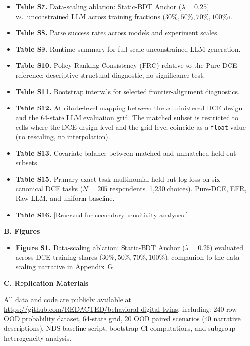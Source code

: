 \documentclass[11pt]{article}
\begin{document}
\begin{itemize}
\item \textbf{Table S7.} Data-scaling ablation: Static-BDT Anchor ($\lambda=0.25$) vs.\ unconstrained LLM across training fractions ($30\%, 50\%, 70\%, 100\%$).
\item \textbf{Table S8.} Parse success rates across models and experiment scales.
\item \textbf{Table S9.} Runtime summary for full-scale unconstrained LLM generation.
\item \textbf{Table S10.} Policy Ranking Consistency (PRC) relative to the Pure-DCE reference; descriptive structural diagnostic, no significance test.
\item \textbf{Table S11.} Bootstrap intervals for selected frontier-alignment diagnostics.
\item \textbf{Table S12.} Attribute-level mapping between the administered DCE design and the 64-state LLM evaluation grid. The matched subset is restricted to cells where the DCE design level and the grid level coincide as a \texttt{float} value (no rescaling, no interpolation).
\item \textbf{Table S13.} Covariate balance between matched and unmatched held-out subsets.
\item \textbf{Table S15.} Primary exact-task multinomial held-out log loss on six canonical DCE tasks ($N = 205$ respondents, 1,230 choices). Pure-DCE, EFR, Raw LLM, and uniform baseline.
\item \textbf{Table S16.} [Reserved for secondary sensitivity analyses.]
\end{itemize}

\textbf{B. Figures}
\begin{itemize}\setlength{\itemsep}{0pt}
\item \textbf{Figure S1.} Data-scaling ablation: Static-BDT Anchor ($\lambda = 0.25$) evaluated across DCE training shares ($30\%, 50\%, 70\%, 100\%$); companion to the data-scaling narrative in Appendix~G.
\end{itemize}

\textbf{C. Replication Materials}

All data and code are publicly available at \url{https://github.com/REDACTED/behavioral-digital-twins}, including: 240-row OOD probability dataset, 64-state grid, 20 OOD paired scenarios (40 narrative descriptions), NDS baseline script, bootstrap CI computations, and subgroup heterogeneity analysis.

\appendix
\end{document}
